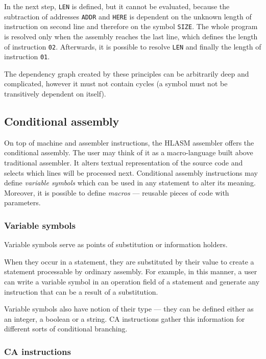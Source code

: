 In the next step, \verb|LEN| is defined, but it cannot be evaluated, because the subtraction of addresses \verb|ADDR| and \verb|HERE| is dependent on the unknown length of instruction on second line and therefore on the symbol \verb|SIZE|. The whole program is resolved only when the assembly reaches the last line, which defines the length of instruction \verb|02|. Afterwards, it is possible to resolve \verb|LEN| and finally the length of instruction \verb|01|.

The dependency graph created by these principles can be arbitrarily deep and complicated, however it must not contain cycles (a symbol must not be transitively dependent on itself).

\subsection{Conditional assembly}
\label{CA_proc}

On top of machine and assembler instructions, the HLASM assembler offers the conditional assembly. The user may think of it as a macro-language built above traditional assembler. It alters textual representation of the source code and selects which lines will be processed next. Conditional assembly instructions may define \emph{variable symbols} which can be used in any statement to alter its meaning. Moreover, it is possible to define \emph{macros} --- reusable pieces of code with parameters.

\subsubsection{Variable symbols}

Variable symbols serve as points of substitution or information holders. 

When they occur in a statement, they are substituted by their value to create a statement processable by ordinary assembly. For example, in this manner, a user can write a variable symbol in an operation field of a statement and generate any instruction that can be a result of a substitution.

Variable symbols also have notion of their type --- they can be defined either as an integer, a boolean or a string. CA instructions gather this information for different sorts of conditional branching.

\subsubsection{CA instructions}

